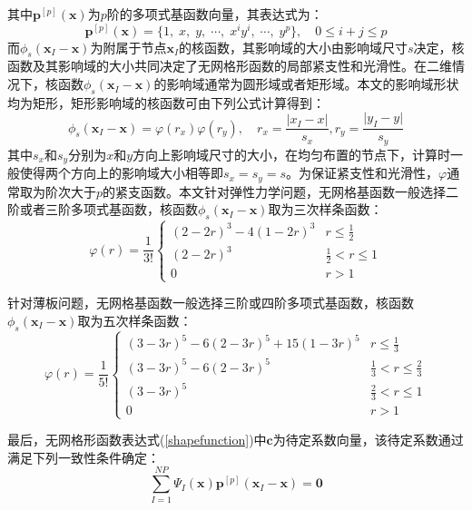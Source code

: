 其中$\pmb{p}^{[p]}(\pmb{x})$为$p$阶的多项式基函数向量，其表达式为：
\begin{equation}
    \pmb{p}^{[p]}(\pmb{x})=\{1,\;x,\;y,\;\dotsb,\;x^iy^i,\;\dotsb,\;y^p\},\quad 0\le i+j \le p
\end{equation}
而$\phi_s(\pmb{x}_I-\pmb{x})$为附属于节点$\pmb{x}_I$的核函数，其影响域的大小由影响域尺寸$s$决定，核函数及其影响域的大小共同决定了无网格形函数的局部紧支性和光滑性。在二维情况下，核函数$\phi_s(\pmb{x}_I-\pmb{x})$的影响域通常为圆形域或者矩形域。本文的影响域形状均为矩形，矩形影响域的核函数可由下列公式计算得到：
\begin{equation}
    \phi_s(\pmb{x}_I-\pmb{x})=\varphi(r_x)\varphi(r_y),\quad r_x=\frac{\lvert x_I-x\rvert}{s_x},r_y=\frac{\lvert y_I-y \rvert}{s_y}
\end{equation}
其中$s_x$和$s_y$分别为$x$和$y$方向上影响域尺寸的大小，在均匀布置的节点下，计算时一般使得两个方向上的影响域大小相等即$s_x=s_y=s$。为保证紧支性和光滑性，$\varphi$通常取为阶次大于$p$的紧支函数。本文针对弹性力学问题，无网格基函数一般选择二阶或者三阶多项式基函数，核函数$\phi_s(\pmb{x}_I-\pmb{x})$取为三次样条函数：
\begin{equation}\label{3B}
    \varphi(r)=\frac{1}{3!}
\begin{cases}
    (2-2r)^3-4(1-2r)^3 &r\le \frac{1}{2}\\
    (2-2r)^3&\frac{1}{2}<r\le 1\\
    0&r>1
\end{cases}
\end{equation}\par
针对薄板问题，无网格基函数一般选择三阶或四阶多项式基函数，核函数$\phi_s(\pmb{x}_I-\pmb{x})$取为五次样条函数：
\begin{equation}
        \varphi(r)=\frac{1}{5!}
\begin{cases}
        (3-3r)^5-6(2-3r)^5+15(1-3r)^5&r\le\frac{1}{3}\\
        (3-3r)^5-6(2-3r)^5&\frac{1}{3}<r\le\frac{2}{3}\\
        (3-3r)^5&\frac{2}{3}<r\le1\\
        0&r>1
\end{cases}
\end{equation}\par
最后，无网格形函数表达式(\ref{shapefunction})中$\pmb{c}$为待定系数向量，该待定系数通过满足下列一致性条件确定：
\begin{equation}\label{regeneration conditions}
    \sum_{I=1}^{N\!P}\Psi_I(\pmb{x})\pmb{p}^{[p]}(\pmb{x}_I-\pmb{x})=\pmb{0}
\end{equation}
